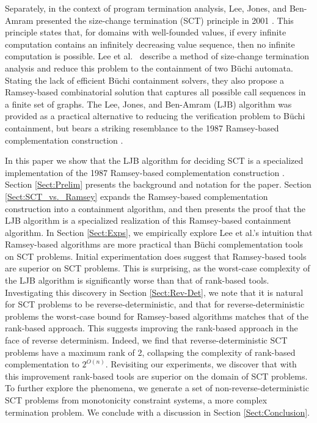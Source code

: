\documentclass{LMCS}
\newcommand\buchi{B\"uchi }
\begin{document}
Separately, in the context of program termination analysis, Lee, Jones, and
Ben-Amram presented the size-change termination (SCT) principle in 2001
\cite{LJB01}.  This principle states that, for domains with well-founded values,
if every infinite computation contains an infinitely decreasing value sequence,
then no infinite computation is possible. Lee et al.~ describe a method of
size-change termination analysis and reduce this problem to the containment of
two \buchi automata. Stating the lack of efficient \buchi containment solvers,
they also propose a Ramsey-based combinatorial solution that captures all
possible call sequences in a finite set of graphs.  The Lee, Jones, and
Ben-Amram (LJB) algorithm was provided as a practical alternative to reducing
the verification problem to \buchi containment, but bears a striking resemblance
to the 1987 Ramsey-based complementation construction \cite{SVW85}.

In this paper we show that the LJB algorithm for deciding SCT
\cite{LJB01} is a specialized implementation of the 1987 Ramsey-based
complementation construction \cite{SVW85}. Section \ref{Sect:Prelim} presents
the background and notation for the paper.  Section \ref{Sect:SCT_vs._Ramsey}
expands the Ramsey-based complementation construction into a containment
algorithm, and then presents the proof that the LJB algorithm is a specialized
realization of this Ramsey-based containment algorithm.  In Section \ref{Sect:Exps}, we
empirically explore Lee et al.'s intuition that Ramsey-based algorithms are more
practical than \buchi complementation tools on SCT problems. Initial
experimentation does suggest that Ramsey-based tools are superior on SCT
problems. This is surprising, as the worst-case complexity of the LJB algorithm
is significantly worse than that of rank-based tools.  Investigating this
discovery in Section \ref{Sect:Rev-Det}, we note that it is natural for SCT problems to be
reverse-deterministic, and that for reverse-deterministic problems the
worst-case bound for Ramsey-based algorithms matches that of the rank-based
approach. This suggests improving the rank-based approach in the face of reverse
determinism. Indeed, we find that reverse-deterministic SCT problems have a
maximum rank of 2, collapsing the complexity of rank-based complementation to
$2^{O(n)}$.  Revisiting our experiments, we discover that with this improvement rank-based tools are
superior on the domain of SCT problems. To further explore the phenomena, we generate a set of
non-reverse-deterministic SCT problems from monotonicity constraint systems, a more complex
termination problem.  We conclude with a discussion in Section
\ref{Sect:Conclusion}. 
\end{document}
